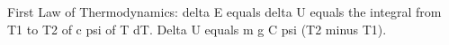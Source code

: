 First Law of Thermodynamics: delta E equals delta U equals the integral from T1 to T2 of c psi of T dT.  
Delta U equals m g C psi (T2 minus T1).